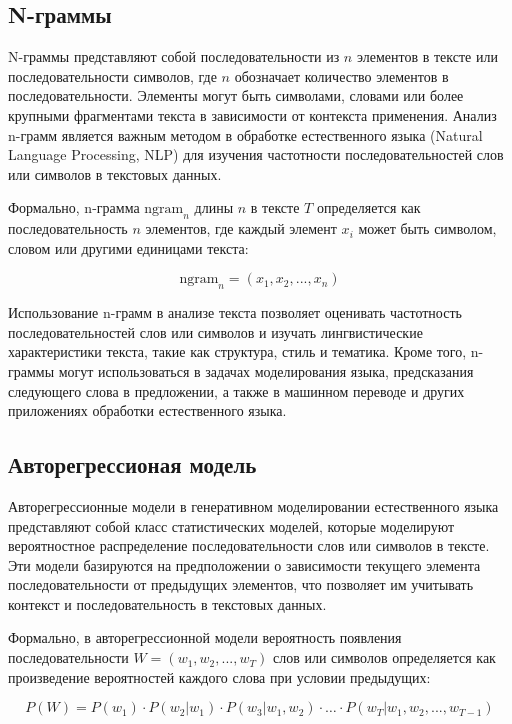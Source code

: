\subsection{N-граммы}

N-граммы представляют собой последовательности из \( n \) элементов в тексте или последовательности символов, где \( n \) обозначает количество элементов в последовательности. Элементы могут быть символами, словами или более крупными фрагментами текста в зависимости от контекста применения. Анализ n-грамм является важным методом в обработке естественного языка (Natural Language Processing, NLP) для изучения частотности последовательностей слов или символов в текстовых данных.

Формально, n-грамма \( \text{ngram}_n \) длины \( n \) в тексте \( T \) определяется как последовательность \( n \) элементов, где каждый элемент \( x_i \) может быть символом, словом или другими единицами текста:

\[ \text{ngram}_n = (x_1, x_2, ..., x_n) \]

Использование n-грамм в анализе текста позволяет оценивать частотность последовательностей слов или символов и изучать лингвистические характеристики текста, такие как структура, стиль и тематика. Кроме того, n-граммы могут использоваться в задачах моделирования языка, предсказания следующего слова в предложении, а также в машинном переводе и других приложениях обработки естественного языка.

\subsection{Авторегрессионая модель}


Авторегрессионные модели в генеративном моделировании естественного языка представляют собой класс статистических моделей, которые моделируют вероятностное распределение последовательности слов или символов в тексте. Эти модели базируются на предположении о зависимости текущего элемента последовательности от предыдущих элементов, что позволяет им учитывать контекст и последовательность в текстовых данных.

Формально, в авторегрессионной модели вероятность появления последовательности \( W = (w_1, w_2, ..., w_T) \) слов или символов определяется как произведение вероятностей каждого слова при условии предыдущих:

\[ P(W) = P(w_1) \cdot P(w_2|w_1) \cdot P(w_3|w_1, w_2) \cdot \ldots \cdot P(w_T|w_1, w_2, ..., w_{T-1}) \]

